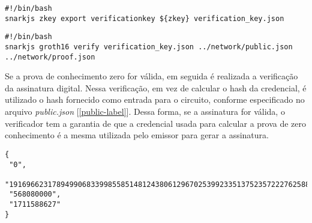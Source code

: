 \begin{lstlisting}[style=shell, caption={Comando para exportar a chave de verificação}, label=command:export-verification-key]
#!/bin/bash
snarkjs zkey export verificationkey ${zkey} verification_key.json
\end{lstlisting}

 
\begin{lstlisting}[style=shell, caption={Comando para verificar a prova}, label=command-verify]
#!/bin/bash
snarkjs groth16 verify verification_key.json ../network/public.json ../network/proof.json
\end{lstlisting}

Se a prova de conhecimento zero for válida, em seguida é realizada a verificação da assinatura digital. Nessa verificação, em vez de calcular o hash da credencial, é utilizado o hash fornecido como entrada para o circuito, conforme especificado no arquivo \textit{public.json} [\ref{public-label}]. Dessa forma, se a assinatura for válida, o verificador tem a garantia de que a credencial usada para calcular a prova de zero conhecimento é a mesma utilizada pelo emissor para gerar a assinatura.

\begin{lstlisting}[language=code, caption=Arquivo public.json, label=public-label]
{
 "0",
 "19169662317894990683399855851481243806129670253992335137523572227625886599311",
 "568080000",
 "1711588627"
}
\end{lstlisting}
